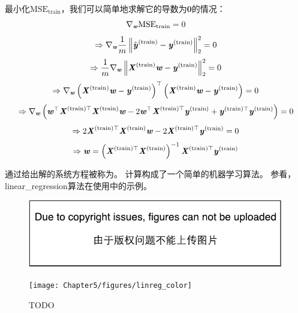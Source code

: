 最小化$\text{MSE}_{\text{train}}$，我们可以简单地求解它的导数为$\mathbf{0}$的情况：
\begin{equation}
\nabla_{\boldsymbol{\mathit{w}}} \text{MSE}_{\text{train}} = 0
\end{equation}
\begin{equation}
\Rightarrow \nabla_{\boldsymbol{\mathit{w}}} \frac{1}{m} \left\lVert \hat{\boldsymbol{\mathit{y}}}^{(\text{train})} - \boldsymbol{\mathit{y}}^{(\text{train})}\right\rVert_2^2 = 0
\end{equation}
\begin{equation}
\Rightarrow \frac{1}{m} \nabla_{\boldsymbol{\mathit{w}}} \left\lVert \boldsymbol{\mathit{X}}^{(\text{train})}\boldsymbol{\mathit{w}} - \boldsymbol{\mathit{y}}^{(\text{train})}\right\rVert_2^2 = 0
\end{equation}
\begin{equation}
\Rightarrow \nabla_{\boldsymbol{\mathit{w}}} \left( \boldsymbol{\mathit{X}}^{(\text{train})}\boldsymbol{\mathit{w}} - \boldsymbol{\mathit{y}}^{(\text{train})} \right)^\top \left( \boldsymbol{\mathit{X}}^{(\text{train})}\boldsymbol{\mathit{w}} - \boldsymbol{\mathit{y}}^{(\text{train})} \right) = 0
\end{equation}
\begin{equation}
\Rightarrow \nabla_{\boldsymbol{\mathit{w}}} \left( 
    \boldsymbol{\mathit{w}}^\top \boldsymbol{\mathit{X}}^{(\text{train})\top}\boldsymbol{\mathit{X}}^{(\text{train})}\boldsymbol{\mathit{w}} - 2\boldsymbol{\mathit{w}}^\top\boldsymbol{\mathit{X}}^{(\text{train})\top} \boldsymbol{\mathit{y}}^{(\text{train})} + \boldsymbol{\mathit{y}}^{(\text{train})\top}\boldsymbol{\mathit{y}}^{(\text{train})}  
  \right) = 0
\end{equation}
\begin{equation}
    \Rightarrow 2\boldsymbol{\mathit{X}}^{(\text{train})\top}\boldsymbol{\mathit{X}}^{(\text{train})} \boldsymbol{\mathit{w}}  -
    2\boldsymbol{\mathit{X}}^{(\text{train})\top} \boldsymbol{\mathit{y}}^{(\text{train})}  = 0
\end{equation}
\begin{equation}
\label{eq:5.12}
    \Rightarrow \Vw =  \left(\MX^{(\text{train})\Tsp}\MX^{(\text{train})}
     \right)^{-1} \MX^{(\text{train})\Tsp} \Vy^{(\text{train})}
\end{equation}


通过给出解的系统方程被称为。
计算构成了一个简单的机器学习算法。
参看，\gls{linear_regression}算法在使用中的示例。

\begin{figure}[!htb]
\ifOpenSource
\centerline{\includegraphics{figure.pdf}}
\else
\centerline{\texttt{[image: Chapter5/figures/linreg\_color]}}
\fi
\caption{TODO}
\label{fig:chap5_linreg}
\end{figure}

